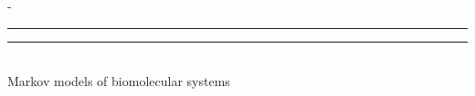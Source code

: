 %
%
% 
%
%
\begin{titlingpage}
\begin{SingleSpace}
\calccentering{\unitlength} 
\begin{adjustwidth*}{\unitlength}{-\unitlength}
\vspace*{13mm}
\begin{center}
\rule[0.5ex]{\linewidth}{2pt}\vspace*{-\baselineskip}\vspace*{3.2pt}
\rule[0.5ex]{\linewidth}{1pt}\\[\baselineskip]

{\HUGE Markov models of biomolecular systems}\\[4mm]


\end{center}
\end{adjustwidth*}
\end{SingleSpace}
\end{titlingpage}
